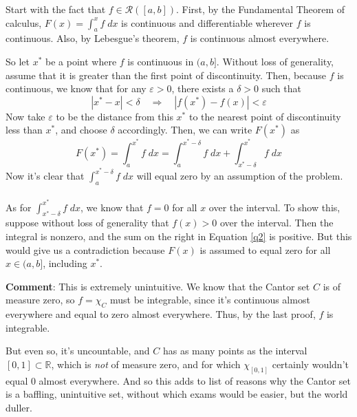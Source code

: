 \documentclass[12pt]{article}
\theoremstyle{plain}
\theoremstyle{definition}
\theoremstyle{remark}
\begin{document}
\begin{enumerate}
Start with the fact that $f\in\mathscr{R}([a,b])$. First, by the Fundamental Theorem of calculus, $F(x)=\int^x_a f\;dx$ is continuous and differentiable wherever $f$ is continuous. Also, by Lebesgue's theorem, $f$ is continuous almost everywhere. 

So let $x^*$ be a point where $f$ is continuous in $(a,b]$. Without loss of generality, assume that it is greater than the first point of discontinuity. Then, because $f$ is continuous, we know that for any $\varepsilon>0$, there exists a $\delta>0$ such that 
\[
    |x^*-x|<\delta \quad \Rightarrow \quad |f(x^*)-f(x)|<\varepsilon
\]
\newpage
Now take $\varepsilon$ to be the distance from this $x^*$ to the nearest point of discontinuity less than $x^*$, and choose $\delta$ accordingly. Then, we can write $F(x^*)$ as 
\begin{equation}
    \label{q2}
    F(x^*) = \int^{x^*}_a f\;dx = 
    \int^{x^* - \delta}_a f\;dx +
    \int^{x^*}_{x^* - \delta} f\;dx
\end{equation}
Now it's clear that $\int^{x^* - \delta}_a f\;dx$ will equal zero by an assumption of the problem. 
\\
\\
As for $\int^{x^*}_{x^* - \delta} f\;dx$, we know that $f=0$ for all $x$ over the interval. To show this, suppose without loss of generality that $f(x)>0$ over the interval. Then the integral is nonzero, and the sum on the right in Equation \ref{q2} is positive. But this would give us a contradiction because $F(x)$ is assumed to equal zero for all $x\in(a,b]$, including $x^*$.

\textbf{Comment}: This is extremely unintuitive. We know that the Cantor set $C$ is of measure zero, so $f=\chi_C$ must be integrable, since it's continuous almost everywhere and equal to zero almost everywhere. Thus, by the last proof, $f$ is integrable. 

But even so, it's uncountable, and $C$ has as many points as the interval $[0,1]\subset\mathbb{R}$, which is \emph{not} of measure zero, and for which $\chi_{[0,1]}$ certainly wouldn't equal 0 almost everywhere.  And so this adds to list of reasons why the Cantor set is a baffling, unintuitive set, without which exams would be easier, but the world duller.
    

\end{enumerate}
\end{document}
